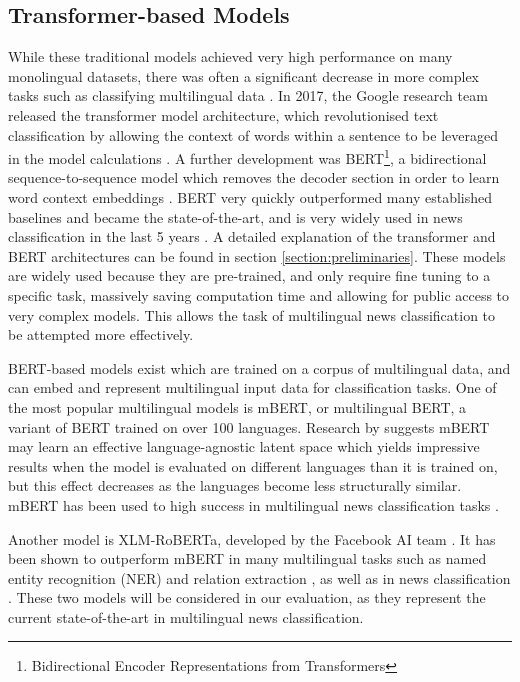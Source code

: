 \documentclass{l4proj}
\begin{document}
\subsection{Transformer-based Models}
\label{section:transformer-based-models}
While these traditional models achieved very high performance on many monolingual datasets, there was often a significant decrease in more complex tasks such as classifying multilingual data \citep{vogel2020detecting}. In 2017, the Google research team released the transformer model architecture, which revolutionised text classification by allowing the context of words within a sentence to be leveraged in the model calculations \citep{vaswani2017attention}. A further development was BERT\footnote{Bidirectional Encoder Representations from Transformers}, a bidirectional sequence-to-sequence model which removes the decoder section in order to learn word context embeddings \citep{devlin2018bert}. BERT very quickly outperformed many established baselines and became the state-of-the-art, and is very widely used in news classification in the last 5 years \citep{chen2022long, mujahid2021classification, deping2021news}. A detailed explanation of the transformer and BERT architectures can be found in section \ref{section:preliminaries}. These models are widely used because they are pre-trained, and only require fine tuning to a specific task, massively saving computation time and allowing for public access to very complex models. This allows the task of multilingual news classification to be attempted more effectively.

BERT-based models exist which are trained on a corpus of multilingual data, and can embed and represent multilingual input data for classification tasks. One of the most popular multilingual models is mBERT, or multilingual BERT, a variant of BERT trained on over 100 languages. Research by \cite{pires2019multilingual} suggests mBERT may learn an effective language-agnostic latent space which yields impressive results when the model is evaluated on different languages than it is trained on, but this effect decreases as the languages become less structurally similar. mBERT has been used to high success in multilingual news classification tasks \citep{kakwani2020indicnlpsuite, hutama2022indonesian}. \par
Another model is XLM-RoBERTa, developed by the Facebook AI team \citep{conneau2019unsupervised}. It has been shown to outperform mBERT in many multilingual tasks such as named entity recognition (NER) and relation extraction \citep{li2021cross, lan2020empirical}, as well as in news classification \citep{alam2020bangla}. These two models will be considered in our evaluation, as they represent the current state-of-the-art in multilingual news classification.
\end{document}

